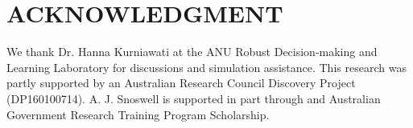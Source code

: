 \documentclass[letterpaper, 10 pt, conference]{ieeeconf}
\begin{document}








\section*{ACKNOWLEDGMENT}

We thank Dr. Hanna Kurniawati at the ANU Robust Decision-making and Learning Laboratory for discussions and simulation assistance.  This research was partly supported by an Australian Research Council Discovery Project (DP160100714).  A. J. Snoswell is supported in part through and Australian Government Research Training Program Scholarship. 





\end{document}

